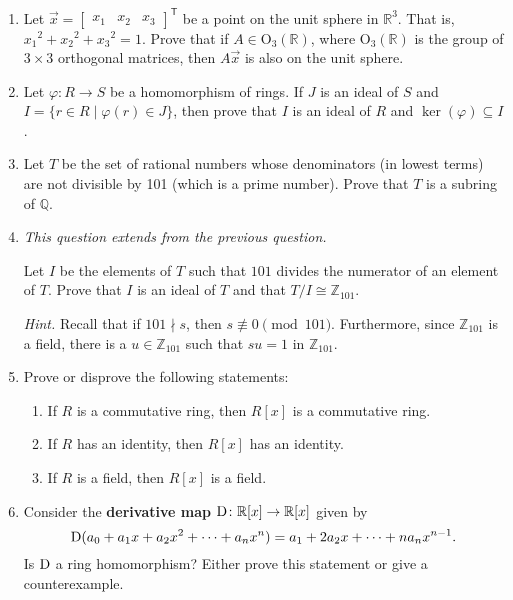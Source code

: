 \begin{enumerate}[label={\sffamily\bfseries\color{main}\arabic*.}]
	\item Let $\vec x=\begin{bmatrix}
	x_1 & x_2 & x_3
	\end{bmatrix}^\mathsf{T}$ be a point on the unit sphere in $\mathbb R^3$. That is, ${x_1}^2+{x_2}^2+{x_3}^2=1$. Prove that if $A\in\mathrm{O}_3(\mathbb R)$, where $\mathrm{O}_3(\mathbb R)$ is the group of $3\times 3$ orthogonal matrices, then $A\vec x$ is also on the unit sphere.

	\item Let $\varphi\colon R\to S$ be a homomorphism of rings. If $J$ is an ideal of $S$ and $I=\{r\in R\mid \varphi(r)\in J\}$, then prove that $I$ is an ideal of $R$ and $\ker(\varphi)\subseteq I$.

	\item Let $T$ be the set of rational numbers whose denominators (in lowest terms) are not divisible by 101 (which is a prime number). Prove that $T$ is a subring of $\mathbb Q$.

	\item \textit{This question extends from the previous question.}

	Let $I$ be the elements of $T$ such that $101$ divides the numerator of an element of $T$. Prove that $I$ is an ideal of $T$ and that $T/I\cong\mathbb Z_{101}$.

	{\footnotesize\textit{\color{main}Hint.} Recall that if $101\!\nmid\! s$, then $s\not\equiv 0\pmod{101}$. Furthermore, since $\mathbb Z_{101}$ is a field, there is a $u\in\mathbb Z_{101}$ such that $su=1$ in $\mathbb Z_{101}$.\par}

	\item Prove or disprove the following statements:
	\begin{enumerate}
		\item If $R$ is a commutative ring, then $R[x]$ is a commutative ring.
		\item If $R$ has an identity, then $R[x]$ has an identity.
		\item If $R$ is a field, then $R[x]$ is a field. 
	\end{enumerate}

	\item Consider the \textbf{derivative map} $\D\colon\mathbb R[x]\to\mathbb R[x]$ given by
	$$\mathrm{D}(a_0+a_1x+a_2x^2+\cdots +a_nx^n)=a_1+2a_2x+\cdots +na_nx^{n-1}.$$
	Is $\D$ a ring homomorphism? Either prove this statement or give a counterexample.


\end{enumerate}
